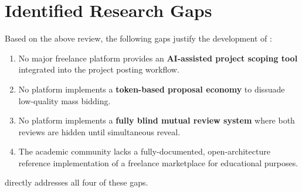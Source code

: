 \section{Identified Research Gaps}

Based on the above review, the following gaps justify the development of \projectname{}:

\begin{enumerate}
  \item No major freelance platform provides an \textbf{AI-assisted project scoping tool} integrated into the project posting workflow.
  \item No platform implements a \textbf{token-based proposal economy} to dissuade low-quality mass bidding.
  \item No platform implements a \textbf{fully blind mutual review system} where both reviews are hidden until simultaneous reveal.
  \item The academic community lacks a fully-documented, open-architecture reference implementation of a freelance marketplace for educational purposes.
\end{enumerate}

\projectname{} directly addresses all four of these gaps.
